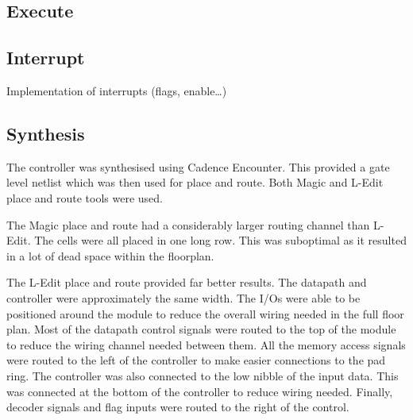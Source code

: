 \subsection{Execute}




\subsection{Interrupt}


Implementation of interrupts (flags, enable\dots)


\subsection{Synthesis}

The controller was synthesised using Cadence Encounter. 
This provided a gate level netlist which was then used for place and route.
Both Magic and L-Edit place and route tools were used. 

The Magic place and route had a considerably larger routing channel than L-Edit.
The cells were all placed in one long row. 
This was suboptimal as it resulted in a lot of dead space within the floorplan.

The L-Edit place and route provided far better results. 
The datapath and controller were approximately the same width. 
The I/Os were able to be positioned around the module to reduce the overall wiring needed in the full floor plan. 
Most of the datapath control signals were routed to the top of the module to reduce the wiring channel needed between them.
All the memory access signals were routed to the left of the controller to make easier connections to the pad ring. 
The controller was also connected to the low nibble of the input data. 
This was connected at the bottom of the controller to reduce wiring needed. 
Finally, decoder signals and flag inputs were routed to the right of the control. 


